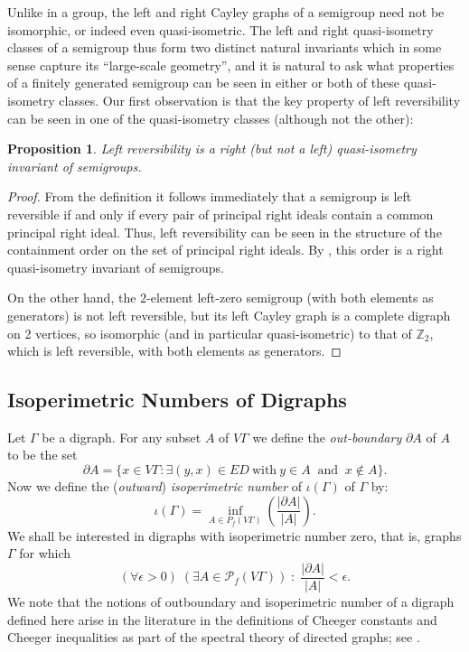 \documentclass[11pt,a4paper,reqno]{amsart}
\newtheorem{proposition}[theorem]{Proposition}
\begin{document}
Unlike in a group, the left and right Cayley graphs of a semigroup need not
be isomorphic,
or indeed even quasi-isometric. The left and right quasi-isometry classes of a semigroup thus
form two distinct natural invariants which in some
sense capture its ``large-scale geometry'', and it is natural to ask
what properties of a finitely generated semigroup can be seen in either
or both of these quasi-isometry classes.
Our first observation is that the key property of left reversibility
can be seen in one of the quasi-isometry classes (although not the other):
\begin{proposition}\label{prop_leftrevqsi}
Left reversibility is a right (but not a left) quasi-isometry invariant
of semigroups.
\end{proposition}
\begin{proof}
From the definition it follows immediately that a semigroup is left
reversible if and only if every pair of principal right ideals contain
a common principal right ideal. Thus, left reversibility can be seen
in the structure of the containment order on the set of principal right
ideals. By \cite[Proposition 5]{K_semimetric}, this order is a right
quasi-isometry invariant of semigroups.

On the other hand, the $2$-element left-zero semigroup (with both elements
as generators) is not left reversible, but its left Cayley graph is a
complete digraph on 2 vertices, so isomorphic (and in particular
quasi-isometric) to that of $\mathbb{Z}_2$, which is left reversible,
with both elements as generators.
\end{proof}

\subsection{Isoperimetric Numbers of Digraphs} Let $\Gamma$ be a digraph.
For any subset $A$ of $V\Gamma$ we define the \textit{out-boundary}
$\partial A$ of $A$ to be the set
\[
\partial A = 
\{
x \in V\Gamma : \exists (y,x) \in ED \ \mbox{with} \  y \in A \ \textrm{ and } \ x \notin A
\}. 
\]
Now we define the (\textit{outward}) \textit{isoperimetric number} of
$\iota(\Gamma)$ of $\Gamma$ by:
\[
\iota(\Gamma) = \inf_{A \in P_f(V\Gamma)}\left(  \frac{|\partial A|}{|A|} \right).
\]
We shall be interested in digraphs with isoperimetric number zero, that is,
graphs $\Gamma$ for which
\begin{equation}
(\forall \epsilon > 0) \; (\exists A \in \mathcal{P}_f(V\Gamma)) \; : \; \frac{|\partial A|}{|A|} < \epsilon. 
\label{eq_star}
\end{equation}
We note that the notions of outboundary and isoperimetric number of a digraph defined here arise in the literature in the definitions of Cheeger constants and Cheeger inequalities as part of the spectral theory of directed graphs; see \cite{Fan2005}.   
\end{document}
